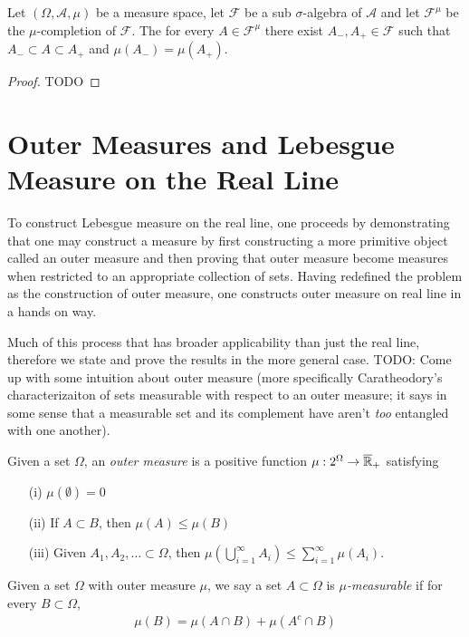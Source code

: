 \begin{lem}Let $(\Omega, \mathcal{A}, \mu)$ be a measure space, let
  $\mathcal{F}$ be a sub $\sigma$-algebra of $\mathcal{A}$ and let
  $\mathcal{F}^{\mu}$ be the $\mu$-completion of $\mathcal{F}$.  The
  for every $A \in \mathcal{F}^{\mu}$ there exist $A_-, A_+ \in
  \mathcal{F}$ such that $A_- \subset A \subset A_+$ and $\mu(A_-) = \mu(A_+)$.
\end{lem}
\begin{proof}
TODO
\end{proof}

\section{Outer Measures and Lebesgue Measure on the Real Line}
To construct Lebesgue measure on the real line, one proceeds by
demonstrating that one may construct a measure by first constructing a more
primitive object called an outer measure and then proving that outer
measure become measures when restricted to an appropriate collection
of sets.  Having redefined the problem as the construction of outer
measure, one constructs outer measure on real line in a hands on way.

Much of this process that has broader applicability than just the real line,  therefore we state and prove the results
in the more general case.
TODO: Come up with some intuition about outer measure (more
specifically Caratheodory's characterizaiton of sets measurable with
respect to an outer measure; it says in some sense that a measurable
set and its complement have aren't \emph{too} entangled with one another).
\begin{defn}Given a set $\Omega$, an \emph{outer measure} is a
positive  function $\mu : 2^\Omega \to \overline{\mathbb{R}}_+$ satisfying
\begin{itemize}
\item[(i)] $\mu(\emptyset) = 0$
\item[(ii)] If $A \subset B$, then $\mu(A) \leq \mu(B)$
\item[(iii)] Given $A_1, A_2, \dots \subset \Omega$, then $\mu \left
    (\bigcup_{i=1}^\infty A_i \right ) \leq \sum_{i=1}^\infty \mu(A_i)$.
\end{itemize}
\end{defn}

\begin{defn}Given a set $\Omega$ with outer measure $\mu$, we say a
  set $A \subset \Omega$ is $\mu$\emph{-measurable} if for every $B
  \subset \Omega$,
\begin{align*}
\mu(B) = \mu(A \cap B) + \mu(A^c \cap B)
\end{align*}
\end{defn}

